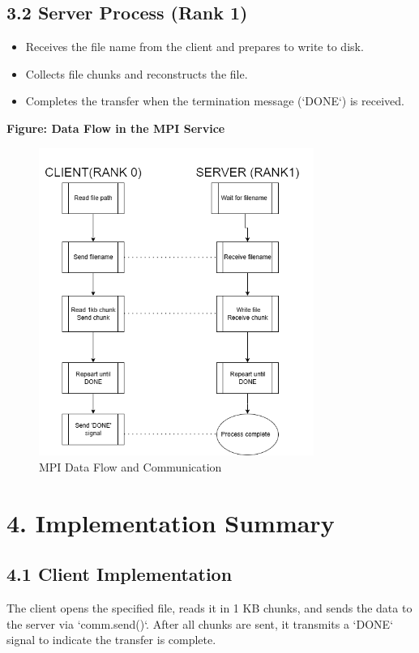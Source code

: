 \documentclass[a4paper,12pt]{article}
\begin{document}
\subsection*{3.2 Server Process (Rank 1)}
\begin{itemize}
    \item Receives the file name from the client and prepares to write to disk.
    \item Collects file chunks and reconstructs the file.
    \item Completes the transfer when the termination message (`DONE`) is received.
\end{itemize}

\noindent \textbf{Figure: Data Flow in the MPI Service}
\begin{figure}[h!]
    \centering
    \includegraphics[width=0.8\textwidth]{implement_flow.png} %
    \caption{MPI Data Flow and Communication}
\end{figure}

\section*{4. Implementation Summary}
\subsection*{4.1 Client Implementation}
The client opens the specified file, reads it in 1 KB chunks, and sends the data to the server via `comm.send()`. After all chunks are sent, it transmits a `DONE` signal to indicate the transfer is complete.
\end{document}
